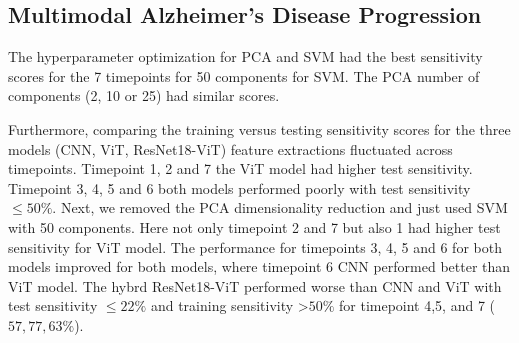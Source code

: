     



\subsection{Multimodal Alzheimer's Disease Progression}
The hyperparameter optimization for PCA and SVM had the best sensitivity scores for the 7 timepoints for 50 components for SVM. The PCA number of components (2, 10 or 25) had similar scores. 

    

Furthermore, comparing the training versus testing sensitivity scores for the three models (CNN, ViT, ResNet18-ViT) feature extractions fluctuated across timepoints. Timepoint 1, 2 and 7 the ViT model had higher test sensitivity. Timepoint 3, 4, 5 and 6 both models performed poorly with test sensitivity $ \leq 50 \%$. Next, we removed the PCA dimensionality reduction and just used SVM with 50 components. Here not only timepoint 2 and 7 but also 1 had higher test sensitivity for ViT model. The performance for timepoints 3, 4, 5 and 6 for both models improved for both models, where timepoint 6 CNN performed better than ViT model.  The hybrd ResNet18-ViT performed worse than CNN and ViT with test sensitivity $\leq 22 \% $ and training sensitivity \textgreater $50 \% $ for timepoint 4,5, and 7 ($57, 77, 63 \%$).  

